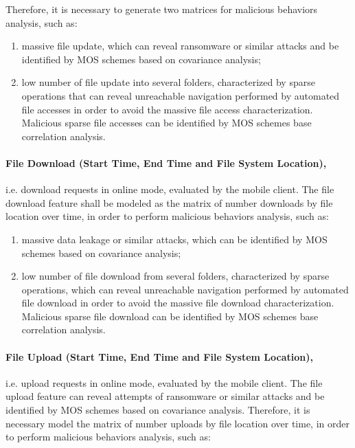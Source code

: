 \documentclass[twocolumn]{svjour3}          	%
\begin{document}
Therefore, it is necessary to generate two matrices for malicious behaviors analysis, such as: 

\begin{enumerate}[label=(\alph*)]
	\item massive file update, which can reveal ransomware or similar attacks and be identified by MOS schemes based on covariance analysis; 
	\item low number of file update into several folders, characterized by sparse operations that can reveal unreachable navigation performed by automated file accesses in order to avoid the massive file access characterization. Malicious sparse file accesses can be identified by MOS schemes base correlation analysis.
\end{enumerate}

\paragraph{\textbf{File Download (Start Time, End Time and File System Location)},}i.e. download requests in online mode, evaluated by the mobile client. The file download feature shall be modeled as the matrix of number downloads by file location over time, in order to perform malicious behaviors analysis, such as:

\begin{enumerate}
	\item massive data leakage or similar attacks, which can be identified by MOS schemes based on covariance analysis;
	\item low number of file download from several folders, characterized by sparse operations, which can reveal unreachable navigation performed by automated file download in order to avoid the massive file download characterization. Malicious sparse file download can be identified by MOS schemes base correlation analysis.
\end{enumerate}

\paragraph{\textbf{File Upload (Start Time, End Time and File System Location)},}i.e. upload requests in online mode, evaluated by the mobile client. The file upload feature can reveal attempts of ransomware or similar attacks and be identified by MOS schemes based on covariance analysis. Therefore, it is necessary model the matrix of number uploads by file location over time, in order to perform malicious behaviors analysis, such as:
\end{document}

